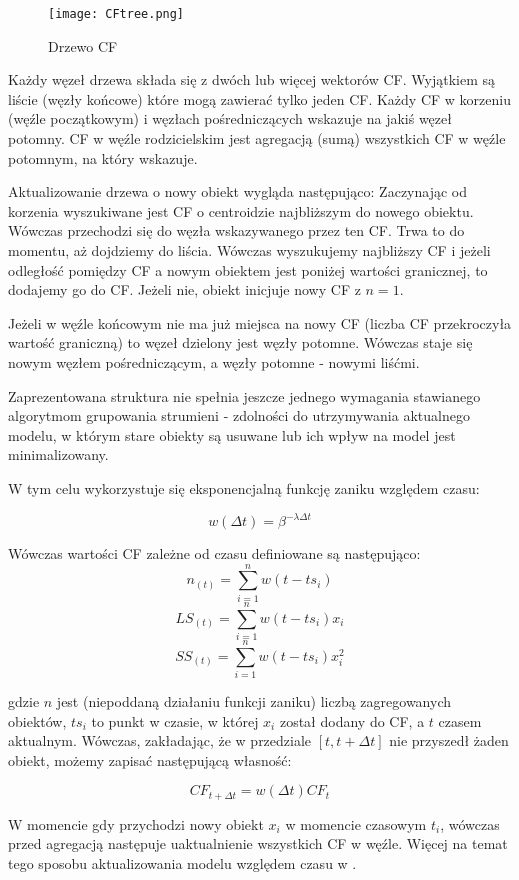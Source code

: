 \documentclass[11pt]{mgr}
\begin{document}
\begin{figure}[H]
\centering
\texttt{[image: CFtree.png]}
\caption{Drzewo CF}
\end{figure}

Każdy węzeł drzewa składa się z dwóch lub więcej wektorów CF. Wyjątkiem są liście (węzły końcowe) które mogą zawierać tylko jeden CF. Każdy CF w korzeniu (węźle początkowym) i węzłach pośredniczących wskazuje na jakiś węzeł potomny. CF w węźle rodzicielskim jest agregacją (sumą) wszystkich CF w węźle potomnym, na który wskazuje.
\par 
Aktualizowanie drzewa o nowy obiekt wygląda następująco: Zaczynając od korzenia wyszukiwane jest CF o centroidzie najbliższym do nowego obiektu. Wówczas przechodzi się do węzła wskazywanego przez ten CF. Trwa to do momentu, aż dojdziemy do liścia. Wówczas wyszukujemy najbliższy CF i jeżeli odległość pomiędzy CF a nowym obiektem jest poniżej wartości granicznej, to dodajemy go do CF. Jeżeli nie, obiekt inicjuje nowy CF z $n=1$.
\par
Jeżeli w węźle końcowym nie ma już miejsca na nowy CF (liczba CF przekroczyła wartość graniczną) to węzeł dzielony jest węzły potomne. Wówczas staje się nowym węzłem pośredniczącym, a węzły potomne - nowymi liśćmi.
\par 
Zaprezentowana struktura nie spełnia jeszcze jednego wymagania stawianego algorytmom grupowania strumieni - zdolności do utrzymywania aktualnego modelu, w którym stare obiekty są usuwane lub ich wpływ na model jest minimalizowany.
\par 
W tym celu wykorzystuje się eksponencjalną funkcję zaniku względem czasu:

$$ w( \Delta t ) = \beta^{- \lambda \Delta t} $$

Wówczas wartości CF zależne od czasu definiowane są następująco:
$$ n_{(t)} = \sum_{i=1}^{n}w(t-ts_i)$$
$$ LS_{(t)} = \sum_{i=1}^{n}w(t-ts_i)x_i$$
$$ SS_{(t)} = \sum_{i=1}^{n}w(t-ts_i)x_i^2$$

gdzie $n$ jest (niepoddaną działaniu funkcji zaniku) liczbą zagregowanych obiektów, $ts_i$ to punkt w czasie, w której $x_i$ został dodany do CF, a $t$ czasem aktualnym.
Wówczas, zakładając, że w przedziale $[t,t+\Delta t]$ nie przyszedł żaden obiekt, możemy zapisać następującą własność:

$$ CF_{t + \Delta t} = w(\Delta t) CF_{t} $$

W momencie gdy przychodzi nowy obiekt $x_i$ w momencie czasowym $t_i$, wówczas przed agregacją następuje uaktualnienie wszystkich CF w węźle. Więcej na temat tego sposobu aktualizowania modelu względem czasu w \cite{kranen2009self}.
\end{document}
